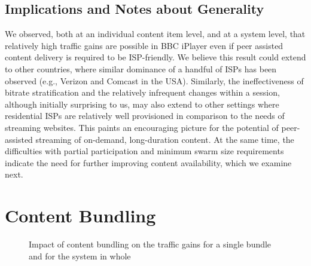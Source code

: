 \documentclass[10pt, conference, letterpaper]{IEEEtran}
\begin{document}
\subsection{Implications and Notes about Generality}
We observed, both at an individual content item level, and at a system level, that relatively high traffic gains are possible in BBC iPlayer even if peer assisted content delivery is required to be ISP-friendly. We believe this result could extend to other countries, where similar dominance of a handful of ISPs has been observed (e.g., Verizon and Comcast in the USA). Similarly, the ineffectiveness of bitrate stratification and the relatively infrequent changes within a session, although initially surprising to us, may also extend to other settings where residential ISPs are relatively well provisioned in comparison to the needs of streaming websites. This paints an encouraging picture for the potential of peer-assisted streaming of on-demand, long-duration content. At the same time, the difficulties with partial participation and minimum swarm size requirements indicate the need for further improving content availability, which we examine next. 












%
 \section{Content Bundling}




 	\begin{figure}
     \centering
 			\hspace{1em}
     \caption{Impact of content bundling on the traffic gains for a single bundle and for the system in whole}\vspace{-4mm}
     \label{gain_two_content_bundle}
   \end{figure}
\end{document}
